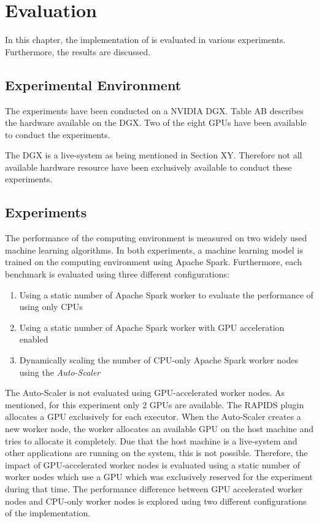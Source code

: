 \chapter{Evaluation}
\label{chap:07_evaluation}

In this chapter, the implementation of  is evaluated in various experiments. Furthermore, the results are discussed.

\section{Experimental Environment}
The experiments have been conducted on a NVIDIA DGX.
Table AB describes the hardware available on the DGX.
Two of the eight GPUs have been available to conduct the experiments.


The DGX is a live-system as being mentioned in Section XY. Therefore not all available hardware resource have been exclusively available to conduct these experiments.


\section{Experiments}
The performance of the computing environment is measured on two widely used machine learning algorithms.
In both experiments, a machine learning model is trained on the computing environment using Apache Spark. Furthermore, each benchmark is evaluated using three different configurations:
\begin{enumerate}
\item Using a static number of Apache Spark worker to evaluate the performance of using only CPUs 
\item Using a static number of Apache Spark worker with GPU acceleration enabled
\item Dynamically scaling the number of CPU-only Apache Spark worker nodes using the \textit{Auto-Scaler}
\end{enumerate}
The Auto-Scaler is not evaluated using GPU-accelerated worker nodes. As mentioned, for this experiment only 2 GPUs are available. The RAPIDS plugin allocates a GPU exclusively for each executor. When the Auto-Scaler creates a new worker node, the worker allocates an available GPU on the host machine and tries to allocate it completely. Due that the host machine is a live-system and other applications are running on the system, this is not possible. Therefore, the impact of GPU-accelerated worker nodes is evaluated using a static number of worker nodes which use a GPU which was exclusively reserved for the experiment during that time.
The performance difference between GPU accelerated worker nodes and CPU-only worker nodes is explored using two different configurations of the implementation.


